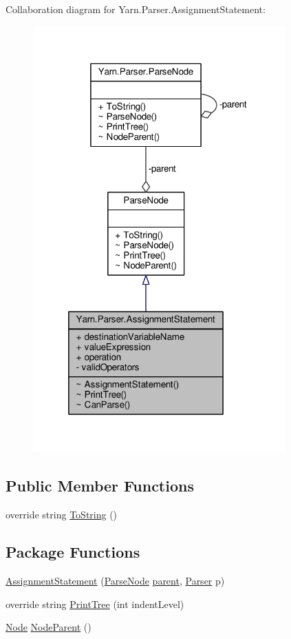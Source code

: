Collaboration diagram for Yarn.\-Parser.\-Assignment\-Statement\-:
\nopagebreak
\begin{figure}[H]
\begin{center}
\leavevmode
\includegraphics[width=275pt]{a00277}
\end{center}
\end{figure}
\subsection*{Public Member Functions}
\begin{DoxyCompactItemize}
\item 
override string \hyperlink{a00077_a18c67cb16090d0889bb9d6c8c6c565f8}{To\-String} ()
\end{DoxyCompactItemize}
\subsection*{Package Functions}
\begin{DoxyCompactItemize}
\item 
\hyperlink{a00033_a34d41e545770d5f41542253d0bb4f8b3}{Assignment\-Statement} (\hyperlink{a00077}{Parse\-Node} \hyperlink{a00077_af313a82103fcc2ff5a177dbb06b92f7b}{parent}, \hyperlink{a00078}{Parser} p)
\item 
override string \hyperlink{a00033_accb9ddcb472eb035a65188c857b8efd8}{Print\-Tree} (int indent\-Level)
\item 
\hyperlink{a00068}{Node} \hyperlink{a00077_a580e520a29444fc23ac3660cbe514a09}{Node\-Parent} ()
\end{DoxyCompactItemize}
